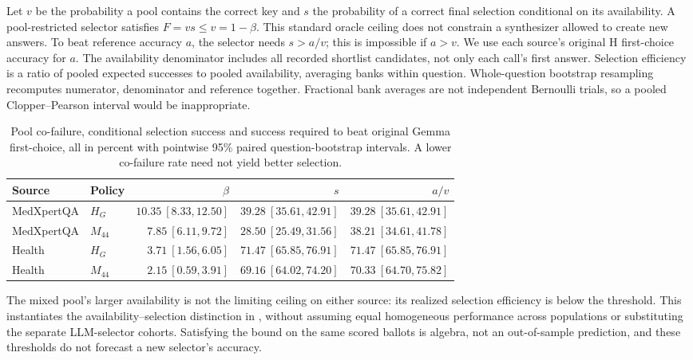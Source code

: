 Let $v$ be the probability a pool contains the correct key and $s$ the probability of a correct final selection conditional on its availability. A pool-restricted selector satisfies $F=vs\leq v=1-\beta$. This standard oracle ceiling \citep{chen2026cofailure} does not constrain a synthesizer allowed to create new answers. To beat reference accuracy $a$, the selector needs $s>a/v$; this is impossible if $a>v$. We use each source's original H first-choice accuracy for $a$. The availability denominator includes all recorded shortlist candidates, not only each call's first answer. Selection efficiency is a ratio of pooled expected successes to pooled availability, averaging banks within question. Whole-question bootstrap resampling recomputes numerator, denominator and reference together. Fractional bank averages are not independent Bernoulli trials, so a pooled Clopper--Pearson interval would be inappropriate.
\begin{table}[htbp]\centering\small
\caption{Pool co-failure, conditional selection success and success required to beat original Gemma first-choice, all in percent with pointwise 95\% paired question-bootstrap intervals. A lower co-failure rate need not yield better selection.}
\label{tab:selection_bound}
\begin{tabular}{llrrr}
\toprule
Source & Policy & $\beta$ & $s$ & $a/v$\\
\midrule
MedXpertQA & $H_G$ & $10.35\ [8.33,12.50]$ & $39.28\ [35.61,42.91]$ & $39.28\ [35.61,42.91]$\\
MedXpertQA & $M_{44}$ & $7.85\ [6.11,9.72]$ & $28.50\ [25.49,31.56]$ & $38.21\ [34.61,41.78]$\\
Health & $H_G$ & $3.71\ [1.56,6.05]$ & $71.47\ [65.85,76.91]$ & $71.47\ [65.85,76.91]$\\
Health & $M_{44}$ & $2.15\ [0.59,3.91]$ & $69.16\ [64.02,74.20]$ & $70.33\ [64.70,75.82]$\\
\bottomrule
\end{tabular}
\end{table}

The mixed pool's larger availability is not the limiting ceiling on either source: its realized selection efficiency is below the threshold. This instantiates the availability--selection distinction in \citet{maryanskyy2026selection}, without assuming equal homogeneous performance across populations or substituting the separate LLM-selector cohorts. Satisfying the bound on the same scored ballots is algebra, not an out-of-sample prediction, and these thresholds do not forecast a new selector's accuracy.

